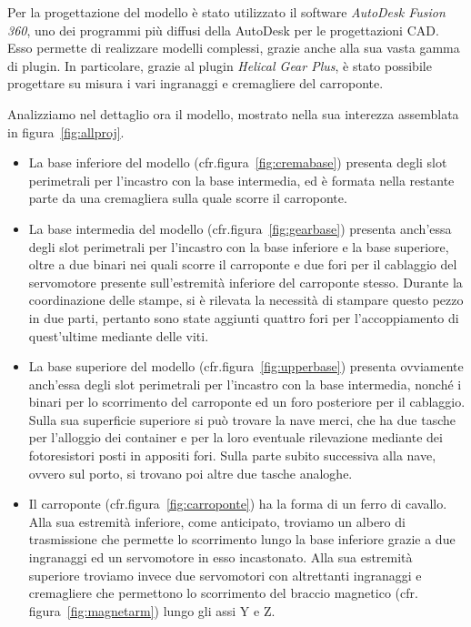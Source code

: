 Per la progettazione del modello è stato utilizzato il software \emph{AutoDesk Fusion 360}, uno dei
programmi più diffusi della AutoDesk per le progettazioni CAD. Esso permette di realizzare modelli
complessi, grazie anche alla sua vasta gamma di plugin. In particolare, grazie al plugin
\emph{Helical Gear Plus}, è stato possibile progettare su misura i vari ingranaggi e cremagliere del
carroponte.

Analizziamo nel dettaglio ora il modello, mostrato nella sua interezza assemblata in
figura~\ref{fig:allproj}.
\begin{itemize}
    \item La base inferiore del modello (cfr.\@ figura~\ref{fig:cremabase}) presenta degli slot perimetrali per l'incastro con la base
        intermedia, ed è formata nella restante parte da una cremagliera sulla quale scorre il carroponte.
    \item La base intermedia del modello (cfr.\@ figura~\ref{fig:gearbase}) presenta anch'essa degli
        slot perimetrali per l'incastro con la base inferiore e la base superiore, oltre a due
        binari nei quali scorre il carroponte e due fori per il cablaggio del servomotore presente
        sull'estremità inferiore del carroponte stesso. Durante la coordinazione delle stampe, si è
        rilevata la necessità di stampare questo pezzo in due parti, pertanto sono state aggiunti
        quattro fori per l'accoppiamento di quest'ultime mediante delle viti.
    \item La base superiore del modello (cfr.\@ figura~\ref{fig:upperbase}) presenta ovviamente
        anch'essa degli slot perimetrali per l'incastro con la base intermedia, nonché i binari per
        lo scorrimento del carroponte ed un foro posteriore per il cablaggio.
        Sulla sua superficie superiore si può trovare la nave merci, che ha due tasche per
        l'alloggio dei container e per la loro eventuale rilevazione mediante dei fotoresistori
        posti in appositi fori. Sulla parte subito successiva alla nave, ovvero sul porto, si trovano poi altre due tasche analoghe.
    \item Il carroponte (cfr.\@ figura~\ref{fig:carroponte}) ha la forma di un ferro di cavallo. Alla
        sua estremità inferiore, come anticipato, troviamo un albero di trasmissione che permette lo
        scorrimento lungo la base inferiore grazie a due ingranaggi ed un servomotore in esso
        incastonato. Alla sua estremità superiore troviamo invece due servomotori con altrettanti
        ingranaggi e cremagliere che permettono lo scorrimento del braccio magnetico (cfr.\@
        figura~\ref{fig:magnetarm}) lungo gli assi Y e Z.
\end{itemize}

